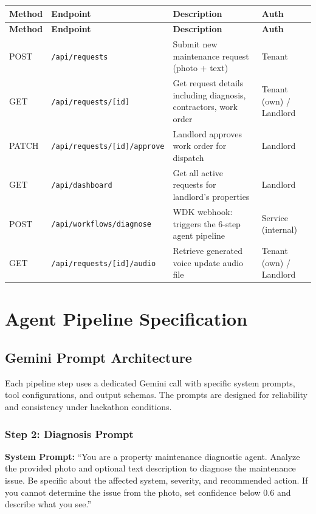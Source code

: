 \documentclass[12pt,a4paper]{article}
\begin{document}
\begin{longtable}{L{1.5cm} L{4cm} L{5cm} L{2.5cm}}
\toprule
\textbf{Method} & \textbf{Endpoint} & \textbf{Description} & \textbf{Auth} \\
\midrule
\endfirsthead
\toprule
\textbf{Method} & \textbf{Endpoint} & \textbf{Description} & \textbf{Auth} \\
\midrule
\endhead
\bottomrule
\endfoot
POST & \texttt{/api/requests} & Submit new maintenance request (photo + text) & Tenant \\
\midrule
GET & \texttt{/api/requests/[id]} & Get request details including diagnosis, contractors, work order & Tenant (own) / Landlord \\
\midrule
PATCH & \texttt{/api/requests/[id]/approve} & Landlord approves work order for dispatch & Landlord \\
\midrule
GET & \texttt{/api/dashboard} & Get all active requests for landlord's properties & Landlord \\
\midrule
POST & \texttt{/api/workflows/diagnose} & WDK webhook: triggers the 6-step agent pipeline & Service (internal) \\
\midrule
GET & \texttt{/api/requests/[id]/audio} & Retrieve generated voice update audio file & Tenant (own) / Landlord \\
\end{longtable}

\section{Agent Pipeline Specification}

\subsection{Gemini Prompt Architecture}

Each pipeline step uses a dedicated Gemini call with specific system prompts, tool configurations, and output schemas. The prompts are designed for reliability and consistency under hackathon conditions.

\subsubsection{Step 2: Diagnosis Prompt}

\textbf{System Prompt:} ``You are a property maintenance diagnostic agent. Analyze the provided photo and optional text description to diagnose the maintenance issue. Be specific about the affected system, severity, and recommended action. If you cannot determine the issue from the photo, set confidence below 0.6 and describe what you see.''
\end{document}
